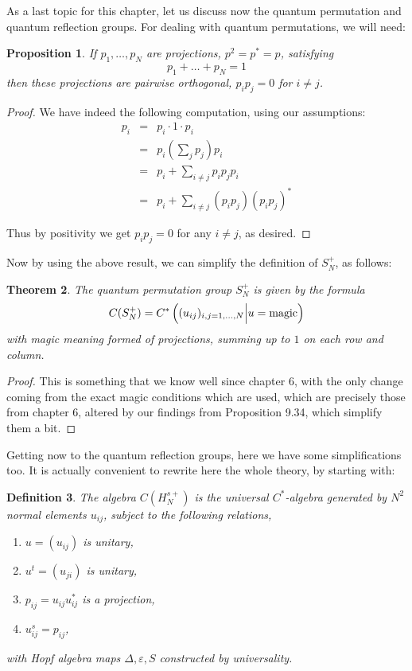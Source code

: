 \documentclass[12pt]{amsbook}
\newtheorem{theorem}{Theorem}[chapter]
\newtheorem{definition}[theorem]{Definition}
\newtheorem{proposition}[theorem]{Proposition}
\begin{document}
As a last topic for this chapter, let us discuss now the quantum permutation and quantum reflection groups. For dealing with quantum permutations, we will need:

\begin{proposition}
If $p_1,\ldots,p_N$ are projections, $p^2=p^*=p$, satisfying
$$p_1+\ldots+p_N=1$$
then these projections are pairwise orthogonal, $p_ip_j=0$ for $i\neq j$.
\end{proposition}

\begin{proof}
We have indeed the following computation, using our assumptions:
\begin{eqnarray*}
p_i
&=&p_i\cdot1\cdot p_i\\
&=&p_i\left(\sum_jp_j\right)p_i\\
&=&p_i+\sum_{i\neq j}p_ip_jp_i\\
&=&p_i+\sum_{i\neq j}(p_ip_j)(p_ip_j)^*
\end{eqnarray*}

Thus by positivity we get $p_ip_j=0$ for any $i\neq j$, as desired.
\end{proof}

Now by using the above result, we can simplify the definition of $S_N^+$, as follows:

\begin{theorem}
The quantum permutation group $S_N^+$ is given by the formula
$$C(S_N^+)=C^*\left((u_{ij})_{i,j=1,\ldots,N}\Big|u={\rm magic}\right)$$
with magic meaning formed of projections, summing up to $1$ on each row and column.
\end{theorem}

\begin{proof}
This is something that we know well since chapter 6, with the only change coming from the exact magic conditions which are used, which are precisely those from chapter 6, altered by our findings from Proposition 9.34, which simplify them a bit.
\end{proof}

Getting now to the quantum reflection groups, here we have some simplifications too. It is actually convenient to rewrite here the whole theory, by starting with:

\begin{definition}
The algebra $C(H_N^{s+})$ is the universal $C^*$-algebra generated by $N^2$ normal elements $u_{ij}$, subject to the following relations,
\begin{enumerate}
\item $u=(u_{ij})$ is unitary,

\item $u^t=(u_{ji})$ is unitary,

\item $p_{ij}=u_{ij}u_{ij}^*$ is a projection,

\item $u_{ij}^s=p_{ij}$,
\end{enumerate}
with Hopf algebra maps $\Delta,\varepsilon,S$ constructed by universality.
\end{definition}
\end{document}
